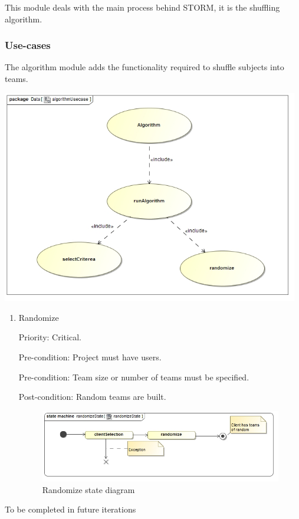 This module deals with the main process behind STORM, it is the shuffling algorithm.

\subsubsection{Use-cases}
The algorithm module adds the functionality required to shuffle subjects into teams.\par
\includegraphics[width=13cm]{./graphics/algorithmUsecase.jpg}
    \rule{0\linewidth}{0.15\linewidth}\par

\begin{enumerate}
\item Randomize\par
Priority: Critical.\par
Pre-condition: Project must have users.\par
Pre-condition: Team size or number of teams must be specified.\par
Post-condition: Random teams are built.\par
    \begin{figure}
        \centering
        \includegraphics[width=13cm]{./graphics/randomizeState.jpg}
        \caption{Randomize state diagram}
        \label{fig:randomize_state}
    \end{figure}
\end{enumerate}
To be completed in future iterations
\pagebreak